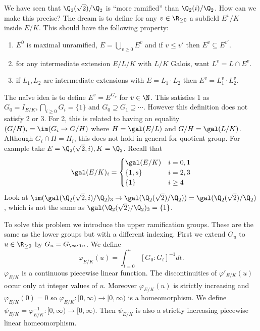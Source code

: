 \documentclass[a4paper]{article}
\begin{document}
We have seen that \(\Q_2(\sqrt 2)/\Q_2\) is ``more ramified'' than \(\Q_2(i)/\Q_2\). How can we make this precise? The dream is to define for any \(v \in \R_{\geq 0}\) a subfield \(E^v/K\) inside \(E/K\). This should have the following property:
\begin{enumerate}
\item \(E^0\) is maximal unramified, \(E = \bigcup_{v \geq 0} E^v\) and if \(v \leq v'\) then \(E^v \subseteq E^{v'}\).
\item for any intermediate extension \(E/L/K\) with \(L/K\) Galois, want \(L^v = L \cap E^v\).
\item if \(L_1, L_2\) are intermediate extensions with \(E = L_1 \cdot L_2\) then \(E^v = L_1^v \cdot L_2^v\).
\end{enumerate}

The naïve idea is to define \(E^v = E^{G_v}\) for \(v \in \N\). This satisfies 1 as \(G_0 = I_{E/K}, \bigcap_{i \geq 0} G_i = \{1\}\) and \(G_0 \supseteq G_1 \supseteq \cdots\). However this definition does not satisfy 2 or 3. For 2, this is related to having an equality \((G/H)_i = \im(G_i \to G/H)\) where \(H = \gal(E/L)\) and \(G/H = \gal(L/K)\). Although \(G_i \cap H = H_i\), this does not hold in general for quotient group. For example take \(E = \Q_2(\sqrt 2, i), K = \Q_2\). Recall that
\[
  \gal(E/K)_i =
  \begin{cases}
    \gal(E/K) & i = 0, 1 \\
    \{1, s\} & i = 2, 3 \\
    \{1\} & i \geq 4
  \end{cases}
\]
Look at \(\im(\gal(\Q_2(\sqrt 2, i)/\Q_2)_3 \to \gal(\Q_2(\sqrt 2)/\Q_2)) = \gal(\Q_2(\sqrt 2)/\Q_2)\), which is not the same as \(\gal(\Q_2(\sqrt 2)/\Q_2)_3 = \{1\}\).

To solve this problem we introduce the upper ramification groups. These are the same as the lower groups but with a different indexing. First we extend \(G_u\) to \(u \in \R_{\geq 0}\) by \(G_u = G_{\ceil u}\). We define
\[
  \varphi_{E/K}(u) = \int_{t = 0}^u [G_0 : G_t]^{-1} dt.
\]
\(\varphi_{E/K}\) is a continuous piecewise linear function. The discontinuities of \(\varphi'_{E/K}(u)\) occur only at integer values of \(u\). Moreover \(\varphi_{E/K}(u)\) is strictly increasing and \(\varphi_{E/K}(0) = 0\) so \(\varphi_{E/K}: [0, \infty) \to [0, \infty)\) is a homeomorphism. We define \(\psi_{E/K} = \varphi_{E/K}^{-1}: [0, \infty) \to [0, \infty)\). Then \(\psi_{E/K}\) is also a strictly increasing piecewise linear homeomorphism.
\end{document}
